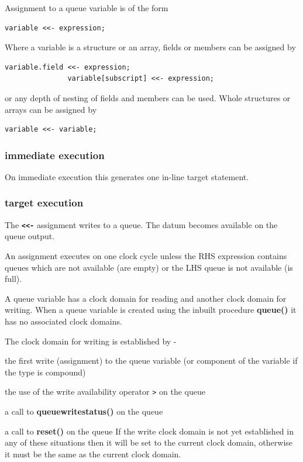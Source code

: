         Assignment to a queue variable is of the form
        \begin{lstlisting}[gobble=8, language=threepl]
               variable <<- expression;
        \end{lstlisting}
        Where a variable is a structure or an array, fields or
        members can be assigned by
        \begin{lstlisting}[gobble=8, language=threepl]
               variable.field <<- expression;
               variable[subscript] <<- expression;
        \end{lstlisting}
        or any depth of nesting of fields and members can be used. Whole
        structures or arrays can be assigned by
        \begin{lstlisting}[gobble=8, language=threepl]
               variable <<- variable;
        \end{lstlisting}

        \subsubsection{immediate execution}
        
            On immediate execution this generates one in-line target statement.
        
        \subsubsection{target execution}
        
            The {\bf \verb'<<-'} assignment writes to a queue. The datum
            becomes available on the queue output.
            
            An assignment executes on one clock cycle unless the RHS
            expression contains queues which are not available (are empty) or
            the LHS queue is not available (is full).
        
            A queue variable has a clock domain for reading and another clock
            domain for writing. When a queue variable is created using the
            inbuilt procedure {\bf queue()}  it has no
            associated clock domains.

            The clock domain for writing is established by -
            \blist
            \item   the first write (assignment) to the queue variable (or
                    component of the variable if the type is compound)
            \item   the use of the write availability operator \verb'>' on the
                    queue
            \item   a call to {\bf queuewritestatus()} on the queue
            \item   a call to {\bf reset()} on the queue
            \blend
            If the write clock domain is not yet established in any of these
            situations then it will be set to the current clock domain,
            otherwise it must be the same as the current clock domain.


